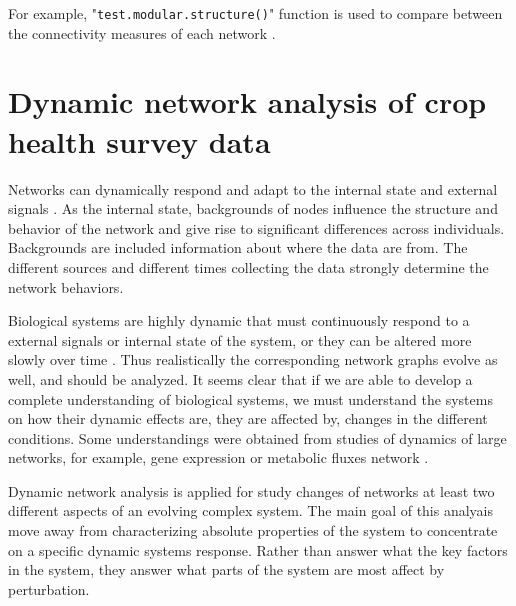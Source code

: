 For example, "\texttt{test.modular.structure()}" function is used to compare between the connectivity measures of each network . 



 

\section*{Dynamic network analysis of crop health survey data}
Networks can dynamically respond and adapt to the internal state and external signals . As the internal state, backgrounds of nodes influence the structure and behavior of the network and give rise to significant differences across individuals. Backgrounds are included information about where the data are from. The different sources and different times collecting the data strongly determine the network behaviors. 

Biological systems are highly dynamic that must continuously respond to a external signals or internal state of the system, or they can be altered more slowly over time . Thus realistically the corresponding network graphs evolve as well, and should be analyzed. It seems clear that if we are able to develop a complete understanding of biological systems, we must understand the systems on how their dynamic effects are, they are affected by, changes in the different conditions. Some understandings were obtained from studies of dynamics of large networks, for example, gene expression or metabolic fluxes network .

Dynamic network analysis is applied for study changes of networks at least two different aspects of an evolving complex system. The main goal of this analyais move away from characterizing absolute properties of the system to concentrate on a specific dynamic systems response. Rather than answer what the key factors in the system, they answer what parts of the system are most affect by perturbation.

